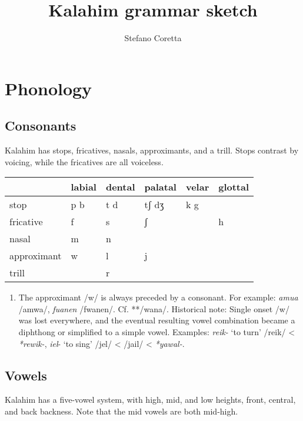 \documentclass[
  a4paper,
]{article}
\title{Kalahim grammar sketch}
\author{Stefano Coretta}
\date{}
\providecommand{\tightlist}{%
  \setlength{\itemsep}{0pt}\setlength{\parskip}{0pt}}
\begin{document}
\maketitle

\hypertarget{phonology}{%
\section{Phonology}\label{phonology}}

\hypertarget{consonants}{%
\subsection{Consonants}\label{consonants}}

Kalahim has stops, fricatives, nasals, approximants, and a trill. Stops
contrast by voicing, while the fricatives are all voiceless.

\begin{longtable}[]{@{}llllll@{}}
\toprule
& labial & dental & palatal & velar & glottal \\
\midrule
\endhead
stop & p b & t d & tʃ dʒ & k g & \\
fricative & f & s & ʃ & & h \\
nasal & m & n & & & \\
approximant & w & l & j & & \\
trill & & r & & & \\
\bottomrule
\end{longtable}

\begin{enumerate}
\def\labelenumi{\arabic{enumi}.}
\tightlist
\item
  The approximant /w/ is always preceded by a consonant. For example:
  \emph{amua} /amwa/, \emph{fuanen} /fwanen/. Cf. **/wana/. Historical
  note: Single onset /w/ was lost everywhere, and the eventual resulting
  vowel combination became a diphthong or simplified to a simple vowel.
  Examples: \emph{reik-} `to turn' /reik/ \textless{} \emph{*rewik-},
  \emph{iel}- `to sing' /jel/ \textless{} /jail/ \textless{}
  \emph{*yawal-}.
\end{enumerate}

\hypertarget{vowels}{%
\subsection{Vowels}\label{vowels}}

Kalahim has a five-vowel system, with high, mid, and low heights, front,
central, and back backness. Note that the mid vowels are both mid-high.
\end{document}
